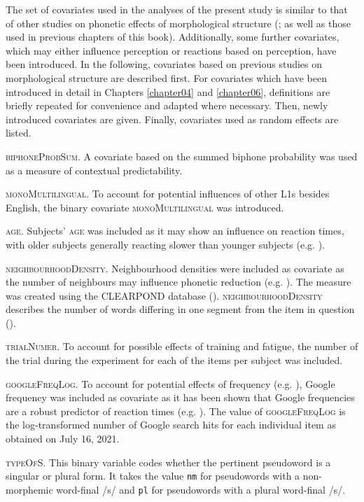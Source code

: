 The set of covariates used in the analyses of the present study is similar to that of other studies on phonetic effects of morphological structure (\cite{Pluymaekers2005a, Pluymaekers2005b, Hanique2013Ernestus, Plag2017}; as well as those used in previous chapters of this book). Additionally, some further covariates, which may either influence perception or reactions based on perception, have been introduced. In the following, covariates based on previous studies on morphological structure are described first. For covariates which have been introduced in detail in Chapters \ref{chapter04} and \ref{chapter06}, definitions are briefly repeated for convenience and adapted where necessary. Then, newly introduced covariates are given. Finally, covariates used as random effects are listed.

\textsc{biphoneProbSum}. A covariate based on the summed biphone probability was used as a measure of contextual predictability.

\textsc{monoMultilingual}. To account for potential influences of other L1s besides English, the binary covariate \textsc{monoMultilingual} was introduced. 

\textsc{age}. Subjects’ \textsc{age} was included as it may show an influence on reaction times, with older subjects generally reacting slower than younger subjects (e.g. \cite{Fozard1994}).

\textsc{neighbourhoodDensity}. Neighbourhood densities were included as covariate as the number of neighbours may influence phonetic reduction (e.g. \cite{Gahl2012}). The measure was created using the CLEARPOND database (\cite{Marian2012}). \textsc{neighbourhoodDensity} describes the number of words differing in one segment from the item in question (\cite[3]{Marian2012}).

\textsc{trialNumer}. To account for possible effects of training and fatigue, the number of the trial during the experiment for each of the items per subject was included. 

\textsc{googleFreqLog}. To account for potential effects of frequency (e.g. \cite{Baayen2006, Keuleers2010, Brysbaert2011}), Google frequency was included as covariate as it has been shown that Google frequencies are a robust predictor of reaction times (e.g. \cite{Hendrix2020}). The value of \textsc{googleFreqLog} is the log-transformed number of Google search hits for each individual item as obtained on July 16, 2021.

\textsc{typeOfS}. This binary variable codes whether the pertinent pseudoword is a singular or plural form. It takes the value \texttt{nm} for pseudowords with a non-morphemic word-final /s/ and \texttt{pl} for pseudowords with a plural word-final /s/.

